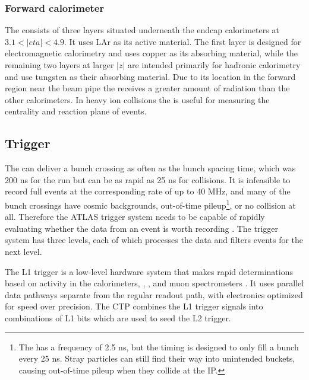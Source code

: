 \subsubsection{Forward calorimeter}
The \fcal consists of three layers situated underneath the endcap calorimeters at $3.1 < |eta| < 4.9$.
It uses \ac{LAr} as its active material.
The first layer is designed for electromagnetic calorimetry and uses copper as its absorbing material, while the remaining two layers at larger $|z|$ are intended primarily for hadronic calorimetry and use tungsten as their absorbing material.
Due to its location in the forward region near the beam pipe the \fcal receives a greater amount of radiation than the other calorimeters.
In heavy ion collisions the \fcal is useful for measuring the centrality and reaction plane of events.

\subsection{Trigger}
\label{subsec:atlas_trigger} %

The \lhc can deliver a bunch crossing as often as the bunch spacing time, which was 200 ns for the \pPb run but can be as rapid as 25 ns for \pp collisions.
It is infeasible to record full events at the corresponding rate of up to 40 MHz, and many of the bunch crossings have cosmic backgrounds, out-of-time pileup\footnote{The \lhc \rf has a frequency of 2.5 ns, but the timing is designed to only fill a bunch every 25 ns. Stray particles can still find their way into unintended \rf buckets, causing out-of-time pileup when they collide at the IP.}, or no collision at all.
Therefore the ATLAS trigger system needs to be capable of rapidly evaluating whether the data from an event is worth recording \cite{Aad:2012xs}. %
The trigger system has three levels, each of which processes the data and filters events for the next level.

The \ac{L1} trigger is a low-level hardware system that makes rapid determinations based on activity in the calorimeters, \mbts, \zdc, and muon spectrometers \cite{ATLAS:1998ad}.
It uses parallel data pathways separate from the regular readout path, with electronics optimized for speed over precision.
The \ac{CTP} combines the \ac{L1} trigger signals into combinations of \ac{L1} bits which are used to seed the \ac{L2} trigger.

